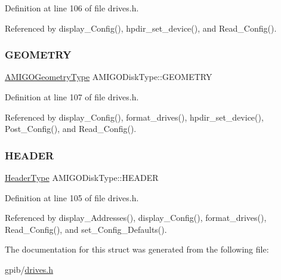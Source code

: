 Definition at line 106 of file drives.\+h.



Referenced by display\+\_\+\+Config(), hpdir\+\_\+set\+\_\+device(), and Read\+\_\+\+Config().

\mbox{\label{structAMIGODiskType_ade07402a60cc0e5824ca61f6a4ea88d9}} 
\subsubsection{\texorpdfstring{G\+E\+O\+M\+E\+T\+RY}{GEOMETRY}}
{\footnotesize\ttfamily \hyperlink{structAMIGOGeometryType}{A\+M\+I\+G\+O\+Geometry\+Type} A\+M\+I\+G\+O\+Disk\+Type\+::\+G\+E\+O\+M\+E\+T\+RY}



Definition at line 107 of file drives.\+h.



Referenced by display\+\_\+\+Config(), format\+\_\+drives(), hpdir\+\_\+set\+\_\+device(), Post\+\_\+\+Config(), and Read\+\_\+\+Config().

\mbox{\label{structAMIGODiskType_a9814efe6f564b104fc7e0100231908a8}} 
\subsubsection{\texorpdfstring{H\+E\+A\+D\+ER}{HEADER}}
{\footnotesize\ttfamily \hyperlink{structHeaderType}{Header\+Type} A\+M\+I\+G\+O\+Disk\+Type\+::\+H\+E\+A\+D\+ER}



Definition at line 105 of file drives.\+h.



Referenced by display\+\_\+\+Addresses(), display\+\_\+\+Config(), format\+\_\+drives(), Read\+\_\+\+Config(), and set\+\_\+\+Config\+\_\+\+Defaults().



The documentation for this struct was generated from the following file\+:\begin{DoxyCompactItemize}
\item 
gpib/\hyperlink{drives_8h}{drives.\+h}\end{DoxyCompactItemize}
